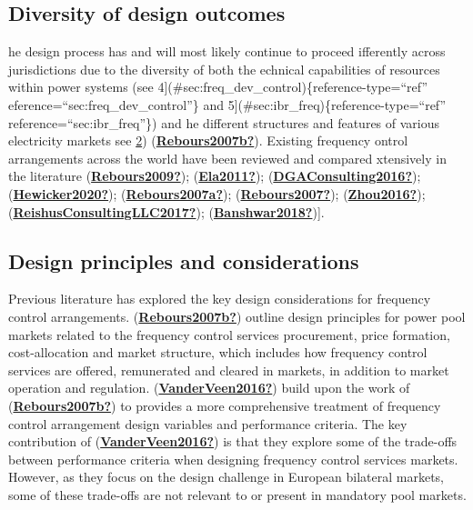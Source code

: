 \documentclass[12pt,a4paper,]{report}
\begin{document}
\hypertarget{diversity-of-design-outcomes}{%
\subsection{Diversity of design
outcomes}\label{diversity-of-design-outcomes}}

he design process has and will most likely continue to proceed
ifferently across jurisdictions due to the diversity of both the
echnical capabilities of resources within power systems (see
4{]}(\#sec:freq\_dev\_control)\{reference-type=``ref''
eference=``sec:freq\_dev\_control''\} and
5{]}(\#sec:ibr\_freq)\{reference-type=``ref''
reference=``sec:ibr\_freq''\}) and he different structures and features
of various electricity markets see
\protect\hyperlink{sec:elec_markets}{2})
(\protect\hyperlink{ref-Rebours2007b}{\textbf{Rebours2007b?}}). Existing
frequency ontrol arrangements across the world have been reviewed and
compared xtensively in the literature
(\protect\hyperlink{ref-Rebours2009}{\textbf{Rebours2009?}});
(\protect\hyperlink{ref-Ela2011}{\textbf{Ela2011?}});
(\protect\hyperlink{ref-DGAConsulting2016}{\textbf{DGAConsulting2016?}});
(\protect\hyperlink{ref-Hewicker2020}{\textbf{Hewicker2020?}});
(\protect\hyperlink{ref-Rebours2007a}{\textbf{Rebours2007a?}});
(\protect\hyperlink{ref-Rebours2007}{\textbf{Rebours2007?}});
(\protect\hyperlink{ref-Zhou2016}{\textbf{Zhou2016?}});
(\protect\hyperlink{ref-ReishusConsultingLLC2017}{\textbf{ReishusConsultingLLC2017?}});
(\protect\hyperlink{ref-Banshwar2018}{\textbf{Banshwar2018?}}){]}.

\hypertarget{design-principles-and-considerations}{%
\subsection{Design principles and
considerations}\label{design-principles-and-considerations}}

Previous literature has explored the key design considerations for
frequency control arrangements.
(\protect\hyperlink{ref-Rebours2007b}{\textbf{Rebours2007b?}}) outline
design principles for power pool markets related to the frequency
control services procurement, price formation, cost-allocation and
market structure, which includes how frequency control services are
offered, remunerated and cleared in markets, in addition to market
operation and regulation.
(\protect\hyperlink{ref-VanderVeen2016}{\textbf{VanderVeen2016?}}) build
upon the work of
(\protect\hyperlink{ref-Rebours2007b}{\textbf{Rebours2007b?}}) to
provides a more comprehensive treatment of frequency control arrangement
design variables and performance criteria. The key contribution of
(\protect\hyperlink{ref-VanderVeen2016}{\textbf{VanderVeen2016?}}) is
that they explore some of the trade-offs between performance criteria
when designing frequency control services markets. However, as they
focus on the design challenge in European bilateral markets, some of
these trade-offs are not relevant to or present in mandatory pool
markets.
\end{document}
